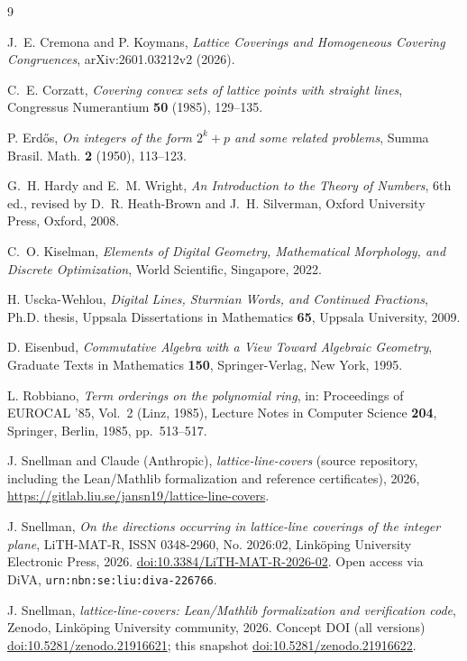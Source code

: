 \documentclass[a4paper,11pt,oneside,reqno]{amsart}
\newcommand{\doi}[1]{\href{https://doi.org/#1}{doi:#1}}
\theoremstyle{definition}
\theoremstyle{remark}
\theoremstyle{plain}
\begin{document}
\begin{thebibliography}{9}

J.~E. Cremona and P. Koymans, \emph{Lattice Coverings and Homogeneous Covering Congruences},
arXiv:2601.03212v2 (2026).

C.~E. Corzatt, \emph{Covering convex sets of lattice points with straight lines}, Congressus
Numerantium \textbf{50} (1985), 129--135.

P. Erd\H{o}s, \emph{On integers of the form \(2^k+p\) and some related problems}, Summa Brasil.
Math. \textbf{2} (1950), 113--123.

G.~H. Hardy and E.~M. Wright, \emph{An Introduction to the Theory of Numbers}, 6th ed., revised
by D.~R. Heath-Brown and J.~H. Silverman, Oxford University Press, Oxford, 2008.

C.~O. Kiselman, \emph{Elements of Digital Geometry, Mathematical Morphology, and Discrete
Optimization}, World Scientific, Singapore, 2022.

H. Uscka-Wehlou, \emph{Digital Lines, Sturmian Words, and Continued Fractions}, Ph.D. thesis,
Uppsala Dissertations in Mathematics \textbf{65}, Uppsala University, 2009.

D. Eisenbud, \emph{Commutative Algebra with a View Toward Algebraic Geometry}, Graduate Texts in
Mathematics \textbf{150}, Springer-Verlag, New York, 1995.

L. Robbiano, \emph{Term orderings on the polynomial ring}, in: Proceedings of EUROCAL '85, Vol.~2
(Linz, 1985), Lecture Notes in Computer Science \textbf{204}, Springer, Berlin, 1985, pp.~513--517.

J. Snellman and Claude (Anthropic), \emph{lattice-line-covers} (source repository, including the
Lean/Mathlib formalization and reference certificates), 2026,
\url{https://gitlab.liu.se/jansn19/lattice-line-covers}.

J. Snellman, \emph{On the directions occurring in lattice-line coverings of the integer plane},
LiTH-MAT-R, ISSN 0348-2960, No. 2026:02, Link\"oping University Electronic Press, 2026.
\doi{10.3384/LiTH-MAT-R-2026-02}. Open access via DiVA, \texttt{urn:nbn:se:liu:diva-226766}.

J. Snellman, \emph{lattice-line-covers: Lean/Mathlib formalization and verification code}, Zenodo,
Link\"oping University community, 2026. Concept DOI (all versions) \doi{10.5281/zenodo.21916621};
this snapshot \doi{10.5281/zenodo.21916622}.

\end{thebibliography}
\end{document}
